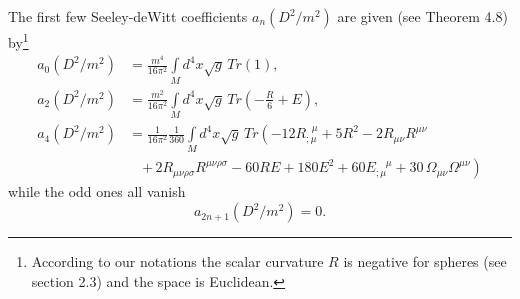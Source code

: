 \documentclass[12pt]{article}%
\begin{document}
The first few Seeley-deWitt coefficients $a_{n}\left(  D^{2}/m^{2}\right)  $
are given (see \cite{Gilkey} Theorem 4.8) by\footnote{According to our
notations the scalar curvature $R$ is negative for spheres (see \cite{Gilkey}
section 2.3) and the space is Euclidean.}
\begin{align}
a_{0}\left(  D^{2}/m^{2}\right)   &  =\frac{m^{4}}{16\pi^{2}}%
{\displaystyle\int\limits_{M}}
d^{4}x\sqrt{g}\,Tr(1),\\
a_{2}\left(  D^{2}/m^{2}\right)   &  =\frac{m^{2}}{16\pi^{2}}%
{\displaystyle\int\limits_{M}}
d^{4}x\sqrt{g}\,Tr\left(  -\frac{R}{6}+E\right)  ,\\
a_{4}\left(  D^{2}/m^{2}\right)   &  =\frac{1}{16\pi^{2}}\frac{1}{360}%
{\displaystyle\int\limits_{M}}
d^{4}x\sqrt{g}\,Tr\left(  -12R_{;\mu}^{\;\;\mu}+5R^{2}-2R_{\mu\nu}R^{\mu\nu
}\right.  \\
&  \quad\left.  +\,2R_{\mu\nu\rho\sigma}R^{\mu\nu\rho\sigma}-60RE+180E^{2}%
+60E_{;\mu}^{\quad\mu}+30\,\Omega_{\mu\nu}\Omega^{\mu\nu}\right)  \nonumber
\end{align}
while the odd ones all vanish
\[
a_{2n+1}\left(  D^{2}/m^{2}\right)  =0.
\]
\end{document}
